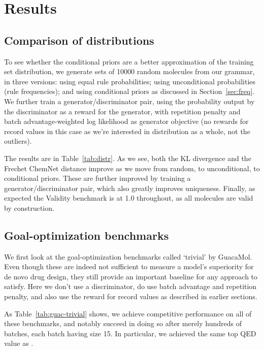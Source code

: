 \documentclass{article}
\begin{document}
\section{Results}\label{sec:results}
\subsection{Comparison of distributions}
To see whether the conditional priors are a better approximation of the training set distribution, we generate sets of 10000 random molecules from our grammar, in three versions: using equal rule probabilities; using unconditional probabilities (rule frequencies); and using conditional priors as discussed in Section~\ref{sec:freq}. We further train a generator/discriminator pair, using the probability output by the discriminator as a reward for the generator, with repetition penalty and batch advantage-weighted log likelihood as generator objective (no rewards for record values in this case as we're interested in distribution as a whole, not the outliers).

The results are in Table~\ref{tab:distr}. As we see, both the KL divergence and the Frechet ChemNet distance improve as we move from random, to unconditional, to conditional priors. These are further improved by training a generator/discriminator pair, which also greatly improves uniqueness. Finally, as expected the Validity benchmark is at 1.0 throughout, as all molecules are valid by construction.

\subsection{Goal-optimization benchmarks}
We first look at the goal-optimization benchmarks called `trivial' by GuacaMol. Even though these are indeed not sufficient to measure a model's superiority for de novo drug design, they still provide an important baseline for any approach to satisfy.
Here we don't use a discriminator, do use batch advantage and repetition penalty, and also use the reward for record values as described in earlier sections.

As Table~\ref{tab:guac-trivial} shows, we achieve competitive performance on all of these benchmarks, and notably succeed in doing so after merely hundreds of batches, each batch having size 15. In particular, we achieved the same top QED value as \cite{you2018}.
\end{document}
